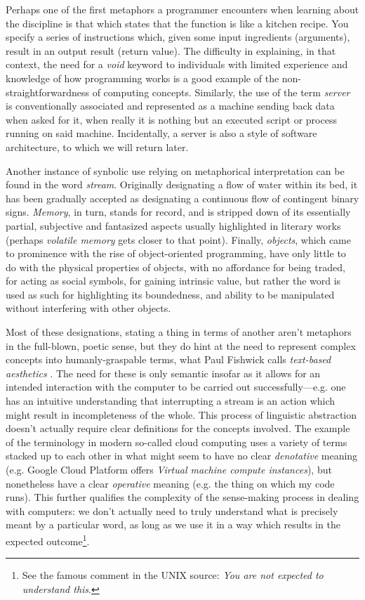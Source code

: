 Perhaps one of the first metaphors a programmer encounters when learning about the discipline is that which states that the function is like a kitchen recipe. You specify a series of instructions which, given some input ingredients (arguments), result in an output result (return value). The difficulty in explaining, in that context, the need for a \emph{void} keyword to individuals with limited experience and knowledge of how programming works is a good example of the non-straightforwardness of computing concepts. Similarly, the use of the term \emph{server} is conventionally associated and represented as a machine sending back data when asked for it, when really it is nothing but an executed script or process running on said machine. Incidentally, a server is also a style of software architecture, to which we will return later.

Another instance of synbolic use relying on metaphorical interpretation can be found in the word \emph{stream}. Originally designating a flow of water within its bed, it has been gradually accepted as designating a continuous flow of contingent binary signs. \emph{Memory}, in turn, stands for record, and is stripped down of its essentially partial, subjective and fantasized aspects usually highlighted in literary works (perhaps \emph{volatile memory} gets closer to that point). Finally, \emph{objects}, which came to prominence with the rise of object-oriented programming, have only little to do with the physical properties of objects, with no affordance for being traded, for acting as social symbols, for gaining intrinsic value, but rather the word is used as such for highlighting its boundedness, and ability to be manipulated without interfering with other objects.

Most of these designations, stating a thing in terms of another aren't metaphors in the full-blown, poetic sense, but they do hint at the need to represent complex concepts into humanly-graspable terms, what Paul Fishwick calls \emph{text-based aesthetics} \citep{fishwick_aesthetic_2006a}. The need for these is only semantic insofar as it allows for an intended interaction with the computer to be carried out successfully—e.g. one has an intuitive understanding that interrupting a stream is an action which might result in incompleteness of the whole. This process of linguistic abstraction doesn't actually require clear definitions for the concepts involved. The example of the terminology in modern so-called cloud computing uses a variety of terms stacked up to each other in what might seem to have no clear \emph{denotative} meaning (e.g. Google Cloud Platform offers \emph{Virtual machine compute instances}), but nonetheless have a clear \emph{operative} meaning (e.g. the thing on which my code runs). This further qualifies the complexity of the sense-making process in dealing with computers: we don't actually need to truly understand what is precisely meant by a particular word, as long as we use it in a way which results in the expected outcome\footnote{See the famous comment in the UNIX source: \emph{You are not expected to understand this}.}.


